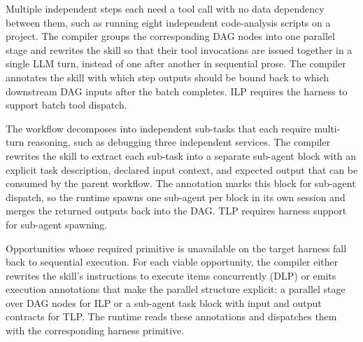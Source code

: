 Multiple independent steps each need a tool call with no
data dependency between them, such as running eight
independent code-analysis scripts on a project. The compiler
groups the corresponding DAG nodes into one parallel stage
and rewrites the skill so that their tool invocations are
issued together in a single LLM turn, instead of one after
another in sequential prose. The compiler annotates the skill with which
step outputs should be bound back to which downstream DAG
inputs after the batch completes. ILP requires the
harness to support batch tool dispatch.

The workflow decomposes into independent sub-tasks that each
require multi-turn reasoning, such as debugging three
independent services. The compiler rewrites the skill to
extract each sub-task into a separate sub-agent block with
an explicit task description, declared input context, and
expected output that can be consumed by the parent workflow.
The annotation marks this block for sub-agent dispatch, so
the runtime spawns one sub-agent per block in its own
session and merges the returned outputs back into the DAG.
TLP requires harness support for sub-agent spawning.

Opportunities whose required primitive is unavailable on the
target harness fall back to sequential execution.
For each viable opportunity, the compiler either rewrites
the skill's instructions to execute items concurrently (DLP)
or emits execution annotations that make the parallel
structure explicit: a parallel stage over DAG nodes for ILP
or a sub-agent task block with input and output contracts
for TLP. The runtime reads these annotations and dispatches
them with the corresponding harness primitive.
